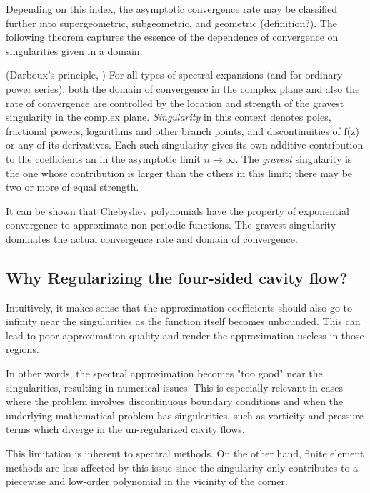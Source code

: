 Depending on this index, the asymptotic convergence rate may be classified 
further into supergeometric, subgeometric, and geometric (definition?). The
following theorem captures the essence of the dependence of convergence on
singularities given in a domain.

\begin{theorem} (Darboux's principle, \citep{boyd2001})
For all types of spectral expansions (and for ordinary power series), both the
domain of convergence in the complex plane and also the rate of convergence
are controlled by the location and strength of the gravest singularity in the
complex plane. \emph{Singularity} in this context denotes poles, fractional powers,
logarithms and other branch points, and discontinuities of f(z) or any of its
derivatives. Each such singularity gives its own additive contribution to the
coefficients an in the asymptotic limit $n\to\infty$. The \emph{gravest}
singularity is the one whose contribution is larger than the others in this
limit; there may be two or more of equal strength.
\end{theorem}

It can be shown that Chebyshev polynomials have the property of exponential
convergence to approximate non-periodic functions. The gravest singularity
dominates the actual convergence rate and domain of convergence.

\subsection{Why Regularizing the four-sided cavity flow?}

Intuitively, it makes sense that the approximation coefficients should also go
to infinity near the singularities as the function itself becomes unbounded.
This can lead to poor approximation quality and render the approximation
useless in those regions.

In other words, the spectral approximation becomes "too good" near the
singularities, resulting in numerical issues. This is especially relevant in
cases where the problem involves discontinuous boundary conditions and when the
underlying mathematical problem has singularities, such as vorticity and
pressure terms which diverge in the un-regularized cavity flows.

This limitation is inherent to spectral methods. On the other hand, finite
element methods are less affected by this issue since the singularity only
contributes to a piecewise and low-order polynomial in the vicinity of the
corner.

